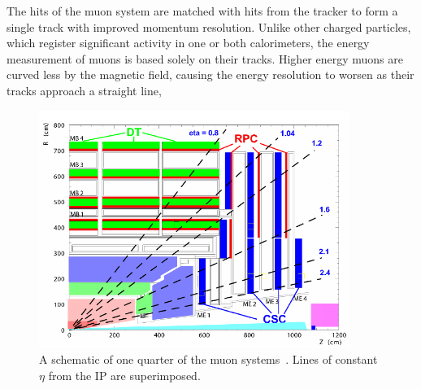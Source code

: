 The hits of the muon system are matched with hits from the tracker to form a single track with
improved momentum resolution. Unlike other charged particles, which register significant activity in
one or both calorimeters, the energy measurement of muons is based solely on their tracks.
Higher energy muons are curved less by the magnetic field,
causing the energy resolution to worsen as their tracks approach a straight line,



\begin{figure}[ht]
 \begin{center}
   \includegraphics[width=0.90\textwidth]{figures/experiment/muons.pdf}
      \end{center}
\caption{A schematic of one quarter of the muon systems~\cite{Chatrchyan:2008zzk}.
Lines of constant $\eta$ from the IP are superimposed.}
\label{fig:muonsystem}
\end{figure}


